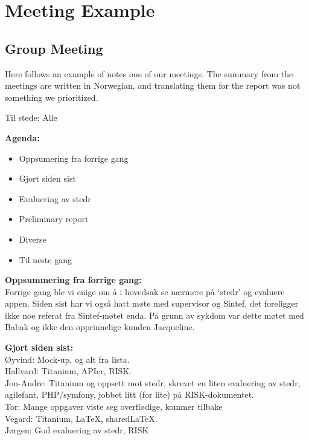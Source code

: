 \section{Meeting Example}

\subsection{Group Meeting}
Here follows an example of notes one of our meetings. The summary from the meetings are written in Norwegian, and translating them for the report was not something we prioritized.\\

\clearpage
{}

Til stede: Alle

\textbf{Agenda:}
\begin{itemize}
\item Oppsumering fra forrige gang
\item Gjort siden sist
\item Evaluering av stedr
\item Preliminary report
\item Diverse
\item Til neste gang
\end{itemize}

\textbf{Oppsummering fra forrige gang:}\\
Forrige gang ble vi enige om å i hovedsak se nærmere på ‘stedr’ og evaluere appen. Siden sist har vi også hatt møte med supervisor og Sintef, det foreligger ikke noe referat fra Sintef-møtet enda. På grunn av sykdom var dette møtet med Babak og ikke den opprinnelige kunden Jacqueline.  

\textbf{Gjort siden sist:}\\
Øyvind: Mock-up, og alt fra lista.\\
Hallvard: Titanium, APIer, RISK.  \\
Jon-Andre: Titanium og oppsett mot stedr, skrevet en liten evaluering av stedr, agilefant, PHP/symfony, jobbet litt (for lite) på RISK-dokumentet.  \\
Tor: Mange oppgaver viste seg overflødige, kommer tilbake\\
Vegard: Titanium, LaTeX, sharedLaTeX.\\
Jørgen: God evaluering av stedr, RISK\\

